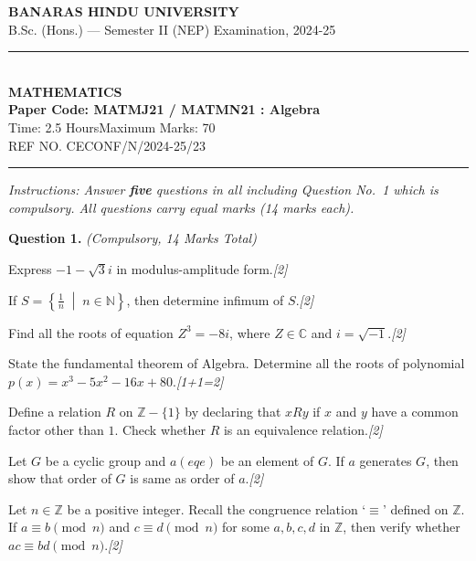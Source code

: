 \documentclass[11pt,a4paper]{article}
\newcommand{\pts}[1]{\hfill   \textit{[#1]}}
\begin{document}
\begin{center}
  {\large\bfseries BANARAS HINDU UNIVERSITY}\\[2pt]
  {\normalsize B.Sc. (Hons.) --- Semester II (NEP) Examination, 2024-25}\\[6pt]
  \rule{0.8\linewidth}{0.5pt}\\[6pt]
  {\large\bfseries MATHEMATICS}\\[4pt]
  {\large\bfseries Paper Code: MATMJ21 / MATMN21 : Algebra}\\[4pt]
  {\normalsize Time: 2.5 Hours\hfill Maximum Marks: 70}\\[2pt]
  {\small REF NO. CECONF/N/2024-25/23}
\end{center}

\rule{\linewidth}{0.4pt}

\smallskip



\noindent   \textit{Instructions: Answer   \textbf{five} questions in all including Question No.~1 which is compulsory. All questions carry equal marks (14 marks each).}

\bigskip




\noindent   \textbf{Question 1.}   \textit{(Compulsory, 14 Marks Total)}

\begin{parts}
  \item Express $-1 - \sqrt{3}i$ in modulus-amplitude form.\pts{2}
  \item If $S = \left\{ \frac{1}{n} \;\middle|\; n \in \mathbb{N} \right\}$, then determine infimum of $S$.\pts{2}
  \item Find all the roots of equation $Z^3 = -8i$, where $Z \in \mathbb{C}$ and $i = \sqrt{-1}$.\pts{2}
  \item State the fundamental theorem of Algebra. Determine all the roots of polynomial $p(x) = x^3 - 5x^2 - 16x + 80$.\pts{1+1=2}
  \item Define a relation $R$ on $\mathbb{Z} - \{1\}$ by declaring that $xRy$ if $x$ and $y$ have a common factor other than $1$. Check whether $R$ is an equivalence relation.\pts{2}
  \item Let $G$ be a cyclic group and $a (
eq e)$ be an element of $G$. If $a$ generates $G$, then show that order of $G$ is same as order of $a$.\pts{2}
  \item Let $n \in \mathbb{Z}$ be a positive integer. Recall the congruence relation `$\equiv$' defined on $\mathbb{Z}$. If $a \equiv b \pmod n$ and $c \equiv d \pmod n$ for some $a, b, c, d$ in $\mathbb{Z}$, then verify whether $ac \equiv bd \pmod n$.\pts{2}
\end{parts}
\end{document}
